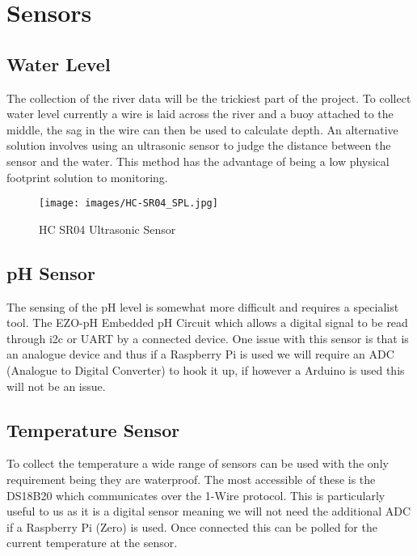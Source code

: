 \section{Sensors}
\subsection{Water Level}
The collection of the river data will be the trickiest part of the project. To collect water level currently a wire is laid across the river and a buoy attached to the middle, the sag in the wire can then be used to calculate depth. \citep{SEPA2016} An alternative solution involves using an ultrasonic sensor to judge the distance between the sensor and the water. \citep{AravindJayan2016} This method has the advantage of being a low physical footprint solution to monitoring. 

\begin{figure}[H]
	\centering
	\texttt{[image: images/HC-SR04\_SPL.jpg]}\\
	\caption{ HC SR04 Ultrasonic Sensor \citep{MouserElectronics}}
	\label{fig:hcsr04}
\end{figure}

\subsection{pH Sensor}
The sensing of the pH level is somewhat more difficult and requires a specialist tool. The EZO-pH Embedded pH Circuit \citep{AtlasScientific2018a} which allows a digital signal to be read through i2c or UART by a connected device. \cite{Dey2018} One issue with this sensor is that is an analogue device and thus if a Raspberry Pi is used we will require an ADC (Analogue to Digital Converter) to hook it up, if however a Arduino is used this will not be an issue.

\subsection{Temperature Sensor}
To collect the temperature a wide range of sensors can be used with the only requirement being they are waterproof. The most accessible of these is the DS18B20 \citep{DS18B20} which communicates over the 1-Wire protocol. This is particularly useful to us as it is a digital sensor meaning we will not need the additional ADC if a Raspberry Pi (Zero) is used. Once connected this can be polled for the current temperature at the sensor. \citep{Monk2013}